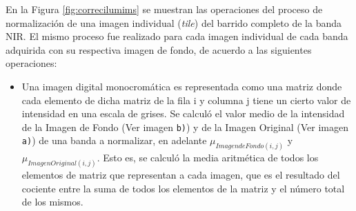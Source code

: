 	
En la Figura \ref{fig:correcilumims} se muestran las operaciones del proceso de normalización de una imagen individual (\textit{tile}) del barrido completo de la banda NIR. El mismo proceso fue realizado para cada imagen individual de cada banda adquirida con su respectiva imagen de fondo, de acuerdo a las siguientes operaciones:
\begin{itemize}
\justifying
\item Una imagen digital monocromática es representada como una matriz donde cada elemento de dicha matriz de la fila i y columna j tiene un cierto valor de intensidad en una escala de grises. Se calculó el valor medio de la intensidad de la Imagen de Fondo (Ver imagen \texttt{b)}) y de la Imagen Original (Ver imagen \texttt{a)}) de una banda a normalizar, en adelante $\mu_{Imagen de Fondo(i,j)}$ y $\mu_{Imagen Original(i,j)}$. Esto
es, se calculó la media aritmética de todos los elementos de matriz que representan a
cada imagen, que es el resultado del cociente entre la suma de todos los elementos de la
matriz y el número total de los mismos.


\end{itemize}

